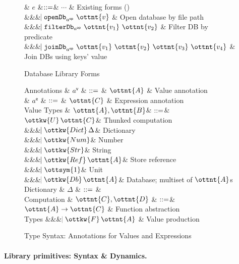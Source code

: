 \begin{figure}
  \begin{grammar}
  \end{grammar}
\end{figure}

\begin{figure}
  \begin{grammar}
  & $e$
    &$\mathrel{::=}$& $\cdots$ & Existing forms ()
    \\ &&& $\bnfaltbrk  \texttt{openDb}_{ a^{\textsf{op} } }~ \ottnt{v} $ & Open database by file path
    \\ &&& $\bnfaltbrk  \texttt{filterDb}_{ a^{\textsf{op} } }~ \ottnt{v_{{\mathrm{1}}}} ~ \ottnt{v_{{\mathrm{2}}}} $ & Filter DB by predicate
    \\ &&& $\bnfaltbrk  \texttt{joinDb}_{ a^{\textsf{op} } }~ \ottnt{v_{{\mathrm{1}}}} ~ \ottnt{v_{{\mathrm{2}}}} ~ \ottnt{v_{{\mathrm{3}}}} ~ \ottnt{v_{{\mathrm{4}}}} $ & Join DBs using keys' value
\end{grammar}
\caption{Database Library Forms}
\label{fig:db-syntax}
\end{figure}


\begin{figure}
\begin{grammar}
  Annotations
    & $a^\textsf{v}$ & $\mathrel{::=}$ & $\ottnt{A}$ & Value annotation
  \\
    & $a^\textsf{e}$ & $\mathrel{::=}$ & $\ottnt{C}$ & Expression annotation
  \\
  Value Types  & $\ottnt{A}, \ottnt{B}$& $\mathrel{::=}$& 
  $ \ottkw{U} \, \ottnt{C}$& Thunked computation
  \\ &&& $\bnfaltbrk \ottkw{Dict} \, \Delta$& Dictionary
  \\ &&& $\bnfaltbrk \ottkw{Num}$& Number
  \\ &&& $\bnfaltbrk \ottkw{Str}$& String
  \\ &&& $\bnfaltbrk \ottkw{Ref} \, \ottnt{A}$& Store reference
  \\ &&& $\bnfaltbrk \ottsym{1}$& Unit
  \\ &&& $\bnfaltbrk \ottkw{Db} \, \ottnt{A}$& Database; multiset of $\ottnt{A}$s
  \\[2mm]
  Dictionary & $\Delta$ & $\mathrel{::=}$ & 
  \\[2mm]
  Computation & $\ottnt{C}, \ottnt{D}$ & $\mathrel{::=}$& 
  $\ottnt{A}  \rightarrow  \ottnt{C}$ & Function abstraction
  \\ 
  Types
  &&& $\bnfaltbrk \ottkw{F} \, \ottnt{A}$ & Value production
\end{grammar}
\caption{Type Syntax: Annotations for Values and Expressions}
\label{fig:types}
\end{figure}



\paragraph{Library primitives: Syntax \& Dynamics.}

